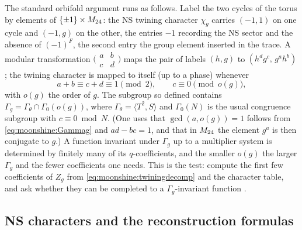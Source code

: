The standard orbifold argument  runs as follows. Label the
two cycles of the torus by elements of $\{\pm1\}\times M_{24}$: the NS twining character
$\chi_g$ carries $(-1,1)$ on one cycle and $(-1,g)$ on the other, the entries $-1$ recording
the NS sector and the absence of $(-1)^F$, the second entry the group element inserted in
the trace. A modular transformation
$\bigl(\begin{smallmatrix}a&b\\c&d\end{smallmatrix}\bigr)$ maps the pair of labels
$(h,g)$ to $(h^dg^c,\,g^ah^b)$; the twining character is mapped to itself (up to a phase)
whenever
\begin{equation}\label{eq:moonshine:Gammag}
  a+b\equiv c+d\equiv1\pmod 2,\qquad c\equiv0\pmod{o(g)},
\end{equation}
with $o(g)$ the order of $g$. The subgroup so defined contains
$\Gamma_g=\Gamma_\theta\cap\Gamma_0(o(g))$, where $\Gamma_\theta=\langle T^2,S\rangle$ and
$\Gamma_0(N)$ is the usual congruence subgroup with $c\equiv0\bmod N$. (One uses that
$\gcd(a,o(g))=1$ follows from \eqref{eq:moonshine:Gammag} and $ad-bc=1$, and that in
$M_{24}$ the element $g^a$ is then conjugate to $g$.) A function invariant under $\Gamma_g$ up
to a multiplier system is determined by finitely many of its $q$-coefficients, and the
smaller $o(g)$ the larger $\Gamma_g$ and the fewer coefficients one needs. This is the test:
compute the first few coefficients of $Z_g$ from \eqref{eq:moonshine:twiningdecomp} and the
character table, and ask whether they can be completed to a $\Gamma_g$-invariant function
.

\subsection{NS characters and the reconstruction formulas}

